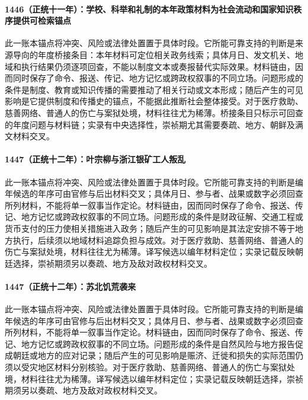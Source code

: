 \paragraph{1446（正统十一年）：学校、科举和礼制的本年政策材料为社会流动和国家知识秩序提供可检索锚点} 此一账本锚点将冲突、风险或法律处置置于具体时段。它所能可靠支持的判断是来源导向的年度桥接条目：本年材料可定位相关政务线索；具体月日、发文机关、地域和执行结果仍须逐项回查，不能以制度文本或奏报替代实际效果。材料链由，因而同时保存了命令、报送、传记、地方记忆或跨政权叙事的不同立场。问题形成的条件是制度、教育或知识传播的需要推动了相关行动或文本形成；随后产生的可见影响是它提供制度和传播史的锚点，不能据此推断社会整体接受。对于医疗救助、慈善网络、普通人的伤亡与案狱处境，材料往往尤为稀薄。桥接条目只标示可回查的年度问题与材料链；实录有中央选择性，崇祯期尤其需要奏疏、地方、朝鲜及满文材料交叉。

\paragraph{1447（正统十二年）：叶宗柳与浙江银矿工人叛乱} 此一账本锚点将冲突、风险或法律处置置于具体时段。它所能可靠支持的判断是编年候选的年序可由官修与后出材料交叉；具体月日、参与者、战果或数字必须回查所列材料，不能将单一叙事当作定论。材料链由，因而同时保存了命令、报送、传记、地方记忆或跨政权叙事的不同立场。问题形成的条件是财政征解、交通工程或货币支付的压力使相关措施进入政务；随后产生的可见影响是其法定安排不等于地方执行，后续须以地域材料追踪负担与成效。对于医疗救助、慈善网络、普通人的伤亡与案狱处境，材料往往尤为稀薄。译写候选以编年材料定位；实录记载反映朝廷选择，崇祯期须另以奏疏、地方及敌对政权材料交叉。

\paragraph{1447（正统十二年）：苏北饥荒袭来} 此一账本锚点将冲突、风险或法律处置置于具体时段。它所能可靠支持的判断是编年候选的年序可由官修与后出材料交叉；具体月日、参与者、战果或数字必须回查所列材料，不能将单一叙事当作定论。材料链由，因而同时保存了命令、报送、传记、地方记忆或跨政权叙事的不同立场。问题形成的条件是自然风险与地方报告促成朝廷或地方的应对记录；随后产生的可见影响是赈济、迁徙和损失的实际范围仍须以受灾地区材料分别核验。对于医疗救助、慈善网络、普通人的伤亡与案狱处境，材料往往尤为稀薄。译写候选以编年材料定位；实录记载反映朝廷选择，崇祯期须另以奏疏、地方及敌对政权材料交叉。

